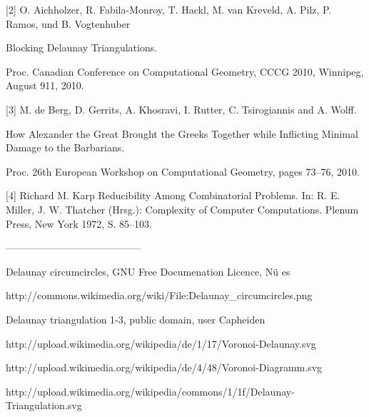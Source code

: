 \documentclass[a4paper,12pt]{article}
\begin{document}
[2] O. Aichholzer, R. Fabila-Monroy, T. Hackl, M. van Kreveld, A. Pilz, P. Ramos, und B. Vogtenhuber

Blocking Delaunay Triangulations. 

Proc. Canadian Conference on Computational Geometry, CCCG 2010, Winnipeg, August 9­11, 2010. 

[3] M. de Berg, D. Gerrits, A. Khosravi, I. Rutter, C. Tsirogiannis and A. Wolff.

How Alexander the Great Brought the Greeks Together while Inflicting Minimal Damage to the Barbarians.

Proc. 26th European Workshop on Computational Geometry, pages 73–76, 2010.

[4] Richard M. Karp
Reducibility Among Combinatorial Problems.
In: R. E. Miller, J. W. Thatcher (Hrsg.): Complexity of Computer Computations. Plenum Press, New York 1972, S. 85–103.

-----------------------------------------


Delaunay circumcircles, GNU Free Documenation Licence, Nü es

http://commons.wikimedia.org/wiki/File:Delaunay\_circumcircles.png


Delaunay triangulation 1-3, public domain, user Capheiden 

http://upload.wikimedia.org/wikipedia/de/1/17/Voronoi-Delaunay.svg

http://upload.wikimedia.org/wikipedia/de/4/48/Voronoi-Diagramm.svg

http://upload.wikimedia.org/wikipedia/commons/1/1f/Delaunay-Triangulation.svg
\end{document}
